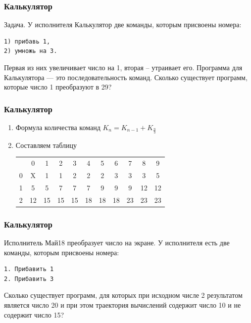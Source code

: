 \begin{frame}[fragile]
\frametitle{Калькулятор}
Задача. У исполнителя Калькулятор две команды, которым присвоены номера:
\begin{verbatim}
1) прибавь 1,  
2) умножь на 3. 
\end{verbatim} 
Первая из них увеличивает число на 1, вторая – утраивает его. Программа для Калькулятора — это последовательность команд. Сколько существует программ, которые число 1 преобразуют в 29? 


\end{frame}

\begin{frame}[fragile]
\frametitle{Калькулятор}
\begin{enumerate}
	\item Формула количества команд $K_n=K_{n-1}+K_{\frac{n}{3}}$
	\item Составляем таблицу\\
	\begin{tabular}{c|c|c|c|c|c|c|c|c|c|c|}
\multicolumn{1}{c}{} & \multicolumn{1}{c}{0} & \multicolumn{1}{c}{1} & \multicolumn{1}{c}{2} & \multicolumn{1}{c}{3} & \multicolumn{1}{c}{4} & \multicolumn{1}{c}{5} & \multicolumn{1}{c}{6} & \multicolumn{1}{c}{7} & \multicolumn{1}{c}{8} & \multicolumn{1}{c}{9}\tabularnewline
\cline{2-11} \cline{3-11} \cline{4-11} \cline{5-11} \cline{6-11} \cline{7-11} \cline{8-11} \cline{9-11} \cline{10-11} \cline{11-11} 
0 & X & 1 & 1 & 2 & 2 & 2 & 3 & 3 & 3 & 5\tabularnewline
\cline{2-11} \cline{3-11} \cline{4-11} \cline{5-11} \cline{6-11} \cline{7-11} \cline{8-11} \cline{9-11} \cline{10-11} \cline{11-11} 
1 & 5 & 5 & 7 & 7 & 7 & 9 & 9 & 9 & 12 & 12\tabularnewline
\cline{2-11} \cline{3-11} \cline{4-11} \cline{5-11} \cline{6-11} \cline{7-11} \cline{8-11} \cline{9-11} \cline{10-11} \cline{11-11} 
2 & 12 & 15 & 15 & 15 & 18 & 18 & 18 & 23 & 23 & 23\tabularnewline
\cline{2-11} \cline{3-11} \cline{4-11} \cline{5-11} \cline{6-11} \cline{7-11} \cline{8-11} \cline{9-11} \cline{10-11} \cline{11-11} 
\end{tabular}
\end{enumerate}


\end{frame}

\begin{frame}[fragile]
\frametitle{Калькулятор}
Исполнитель Май18 преобразует число на экране. У исполнителя есть две команды, которым присвоены номера:
\begin{verbatim}
1. Прибавить 1
2. Прибавить 3
\end{verbatim} 
Сколько существует программ, для которых при исходном числе 2 результатом является число 20 и при этом траектория вычислений содержит число 10 и не содержит число 15?


\end{frame}

